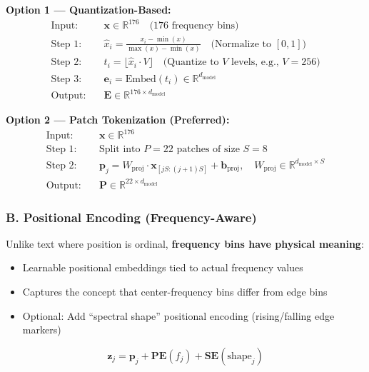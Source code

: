 \documentclass[12pt, a4paper]{article}
\begin{document}
\textbf{Option 1 — Quantization-Based:}
\begin{align}
    \text{Input:} &\quad \mathbf{x} \in \mathbb{R}^{176} \quad \text{(176 frequency bins)} \nonumber \\
    \text{Step 1:} &\quad \hat{x}_i = \frac{x_i - \min(x)}{\max(x) - \min(x)} \quad \text{(Normalize to } [0,1]\text{)} \nonumber \\
    \text{Step 2:} &\quad t_i = \lfloor \hat{x}_i \cdot V \rfloor \quad \text{(Quantize to } V \text{ levels, e.g., } V=256\text{)} \nonumber \\
    \text{Step 3:} &\quad \mathbf{e}_i = \text{Embed}(t_i) \in \mathbb{R}^{d_\text{model}} \nonumber \\
    \text{Output:} &\quad \mathbf{E} \in \mathbb{R}^{176 \times d_\text{model}} \nonumber
\end{align}

\textbf{Option 2 — Patch Tokenization (Preferred):}
\begin{align}
    \text{Input:} &\quad \mathbf{x} \in \mathbb{R}^{176} \nonumber \\
    \text{Step 1:} &\quad \text{Split into } P = 22 \text{ patches of size } S = 8 \nonumber \\
    \text{Step 2:} &\quad \mathbf{p}_j = W_\text{proj} \cdot \mathbf{x}_{[jS:(j+1)S]} + \mathbf{b}_\text{proj}, \quad W_\text{proj} \in \mathbb{R}^{d_\text{model} \times S} \nonumber \\
    \text{Output:} &\quad \mathbf{P} \in \mathbb{R}^{22 \times d_\text{model}} \nonumber
\end{align}


\subsubsection{B. Positional Encoding (Frequency-Aware)}

Unlike text where position is ordinal, \textbf{frequency bins have physical meaning}:
\begin{itemize}[leftmargin=1.5em]
    \item Learnable positional embeddings tied to actual frequency values
    \item Captures the concept that center-frequency bins differ from edge bins
    \item Optional: Add ``spectral shape'' positional encoding (rising/falling edge markers)
\end{itemize}

\begin{equation}
    \mathbf{z}_j = \mathbf{p}_j + \mathbf{PE}(f_j) + \mathbf{SE}(\text{shape}_j)
\end{equation}
\end{document}
